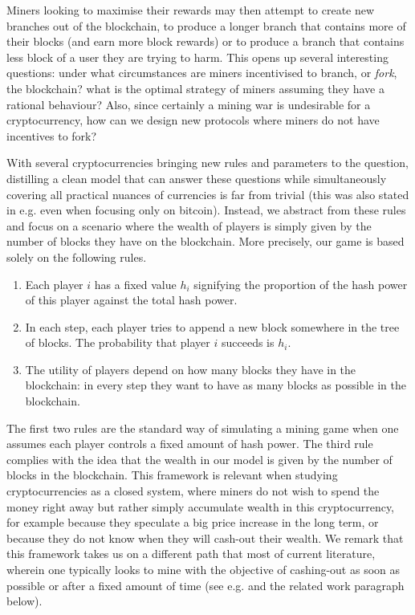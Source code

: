 Miners looking to maximise their rewards may then attempt to create new branches out of the blockchain, to produce a longer branch that contains more of their blocks (and earn more block rewards) or to produce a branch that contains less block of a user they are trying to harm. This opens up several interesting questions: under what circumstances are miners 
incentivised to branch, or \emph{fork}, the blockchain? what is the optimal strategy of miners assuming they have a rational behaviour? Also, since certainly a mining war is undesirable for a cryptocurrency, how can we design new protocols where miners do not have incentives to fork? 

With several cryptocurrencies bringing new rules and parameters to the question, distilling a clean model that can answer these questions while simultaneously covering 
all practical nuances of currencies is far from trivial (this was also stated in e.g. \cite{mininggames:2016} even when focusing only on bitcoin). Instead, we abstract from these rules and focus on 
a scenario where the wealth of players is simply given by the number of blocks they have on the blockchain. More precisely, our game is based solely on the following rules. 
\begin{enumerate}
\item Each player $i$ has a fixed value $h_i$ signifying the proportion of the hash power of this player against the total hash power. 
\item In each step, each player tries to append a new block somewhere in the tree of blocks. The probability that player $i$ succeeds is $h_i$.
\item The utility of players depend on how many blocks they have in the blockchain: in every step they want to have as many blocks as possible in the blockchain.
\end{enumerate}
\noindent
The first two rules are the standard way of simulating a mining game when one assumes each player controls a fixed amount of hash power. The third rule complies with the idea that the wealth in our model is given by the number of blocks in the blockchain. This framework is relevant when studying cryptocurrencies as a closed system, where miners do not wish to spend the money right away but rather simply accumulate wealth in 
this cryptocurrency, for example because they speculate a big price increase in the long term, or because they do not know when they will cash-out their wealth. We remark that this framework takes us on a different path that most of current literature, wherein one typically looks to mine with the objective of cashing-out as soon as possible or after a fixed amount of time (see e.g. \cite{mininggames:2016,?} and the related work paragraph below). 


